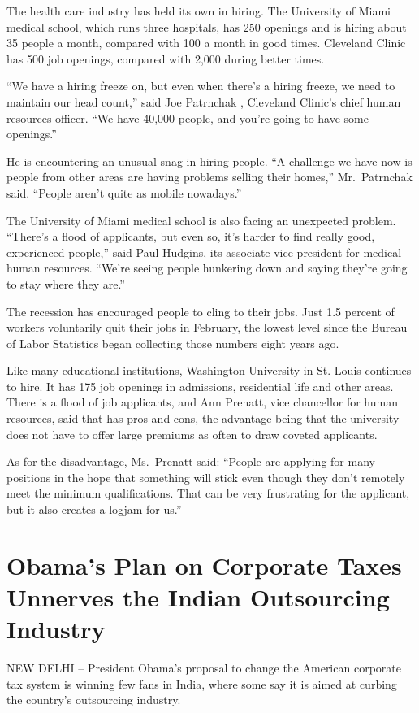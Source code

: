 \documentclass[12pt,a4paper,onecolumn]{article}
\begin{document}
The health care industry has held its own in hiring. The University of Miami medical school, which
runs three hospitals, has 250 openings and is hiring about 35 people a month, compared with 100 a
month in good times. Cleveland Clinic has 500 job openings, compared with 2,000 during better times.

``We have a hiring freeze on, but even when there's a hiring freeze, we need to maintain our head
count,'' said Joe Patrnchak , Cleveland Clinic's chief human resources officer. ``We have 40,000
people, and you're going to have some openings.''

He is encountering an unusual snag in hiring people. ``A challenge we have now is people from other
areas are having problems selling their homes,'' Mr.~Patrnchak said. ``People aren't quite as mobile
nowadays.''

The University of Miami medical school is also facing an unexpected problem. ``There's a flood of
applicants, but even so, it's harder to find really good, experienced people,'' said Paul Hudgins,
its associate vice president for medical human resources. ``We're seeing people hunkering down and
saying they're going to stay where they are.''

The recession has encouraged people to cling to their jobs. Just 1.5 percent of workers voluntarily
quit their jobs in February, the lowest level since the Bureau of Labor Statistics began collecting
those numbers eight years ago.

Like many educational institutions, Washington University in St. Louis continues to hire. It has 175
job openings in admissions, residential life and other areas. There is a flood of job applicants,
and Ann Prenatt, vice chancellor for human resources, said that has pros and cons, the advantage
being that the university does not have to offer large premiums as often to draw coveted applicants.

As for the disadvantage, Ms.~Prenatt said: ``People are applying for many positions in the hope that
something will stick even though they don't remotely meet the minimum qualifications. That can be
very frustrating for the applicant, but it also creates a logjam for us.''

\section{Obama's Plan on Corporate Taxes Unnerves the Indian Outsourcing Industry}

NEW DELHI -- President Obama's proposal to change the American corporate tax system is winning few
fans in India, where some say it is aimed at curbing the country's outsourcing industry.
\end{document}

